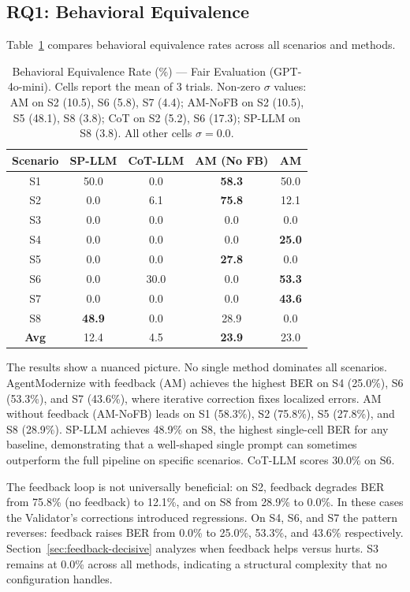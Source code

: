 \documentclass[conference]{IEEEtran}
\begin{document}
\subsection{RQ1: Behavioral Equivalence}

Table~\ref{tab:rq1} compares behavioral equivalence rates across all scenarios and methods.

\begin{table}[htbp]
\caption{Behavioral Equivalence Rate (\%) --- Fair Evaluation (GPT-4o-mini). Cells report the mean of 3 trials. Non-zero $\sigma$ values: AM on S2 (10.5), S6 (5.8), S7 (4.4); AM-NoFB on S2 (10.5), S5 (48.1), S8 (3.8); CoT on S2 (5.2), S6 (17.3); SP-LLM on S8 (3.8). All other cells $\sigma = 0.0$.}
\label{tab:rq1}
\centering
\footnotesize
\begin{tabular}{@{}ccccc@{}}
\toprule
\textbf{Scenario} & \textbf{SP-LLM} & \textbf{CoT-LLM} & \textbf{AM (No FB)} & \textbf{AM} \\
\midrule
S1 & 50.0 & 0.0 & \textbf{58.3} & 50.0 \\
S2 & 0.0 & 6.1 & \textbf{75.8} & 12.1 \\
S3 & 0.0 & 0.0 & 0.0 & 0.0 \\
S4 & 0.0 & 0.0 & 0.0 & \textbf{25.0} \\
S5 & 0.0 & 0.0 & \textbf{27.8} & 0.0 \\
S6 & 0.0 & 30.0 & 0.0 & \textbf{53.3} \\
S7 & 0.0 & 0.0 & 0.0 & \textbf{43.6} \\
S8 & \textbf{48.9} & 0.0 & 28.9 & 0.0 \\
\midrule
\textbf{Avg} & 12.4 & 4.5 & \textbf{23.9} & 23.0 \\
\bottomrule
\end{tabular}
\end{table}

The results show a nuanced picture. No single method dominates all scenarios. AgentModernize with feedback (AM) achieves the highest BER on S4 (25.0\%), S6 (53.3\%), and S7 (43.6\%), where iterative correction fixes localized errors. AM without feedback (AM-NoFB) leads on S1 (58.3\%), S2 (75.8\%), S5 (27.8\%), and S8 (28.9\%). SP-LLM achieves 48.9\% on S8, the highest single-cell BER for any baseline, demonstrating that a well-shaped single prompt can sometimes outperform the full pipeline on specific scenarios. CoT-LLM scores 30.0\% on S6.

The feedback loop is not universally beneficial: on S2, feedback degrades BER from 75.8\% (no feedback) to 12.1\%, and on S8 from 28.9\% to 0.0\%. In these cases the Validator's corrections introduced regressions. On S4, S6, and S7 the pattern reverses: feedback raises BER from 0.0\% to 25.0\%, 53.3\%, and 43.6\% respectively. Section~\ref{sec:feedback-decisive} analyzes when feedback helps versus hurts. S3 remains at 0.0\% across all methods, indicating a structural complexity that no configuration handles.
\end{document}
